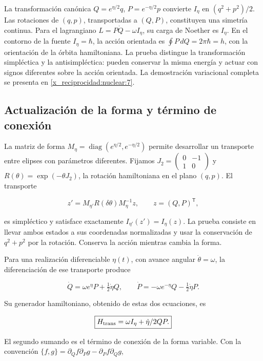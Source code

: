 La transformación canónica \(Q=e^{\eta/2}q\), \(P=e^{-\eta/2}p\) convierte \(I_\eta\) en \((q^2+p^2)/2\). Las rotaciones de \((q,p)\), transportadas a \((Q,P)\), constituyen una simetría continua. Para el lagrangiano \(L=P\dot Q-\omega I_\eta\), su carga de Noether es \(I_\eta\). En el contorno de la fuente \(I_\eta=\hbar\), la acción orientada es \(\oint P\,dQ=2\pi\hbar=h\), con la orientación de la órbita hamiltoniana. La prueba distingue la transformación simpléctica y la antisimpléctica: pueden conservar la misma energía y actuar con signos diferentes sobre la acción orientada. La demostración variacional completa se presenta en \cref{x_reciprocidad:nuclear:7}.

\subsection{Actualización de la forma y término de conexión}

La matriz de forma \(M_\eta=\operatorname{diag}(e^{\eta/2},e^{-\eta/2})\) permite desarrollar un transporte entre elipses con parámetros diferentes. Fijamos \(J_2=\begin{pmatrix}0&-1\\1&0\end{pmatrix}\) y \(R(\theta)=\exp(-\theta J_2)\), la rotación hamiltoniana en el plano \((q,p)\). El transporte

\[
z'=M_{\eta'}R(\delta\theta)M_\eta^{-1}z,
\qquad z=(Q,P)^\mathsf T,
\]

es simpléctico y satisface exactamente \(I_{\eta'}(z')=I_\eta(z)\). La prueba consiste en llevar ambos estados a sus coordenadas normalizadas y usar la conservación de \(q^2+p^2\) por la rotación. Conserva la acción mientras cambia la forma.

Para una realización diferenciable \(\eta(t)\), con avance angular \(\dot\theta=\omega\), la diferenciación de ese transporte produce

\[
\dot Q=\omega e^\eta P+\tfrac12\dot\eta Q,\qquad
\dot P=-\omega e^{-\eta}Q-\tfrac12\dot\eta P.
\]

Su generador hamiltoniano, obtenido de estas dos ecuaciones, es

\begin{equation}
\boxed{H_{\rm trans}=\omega I_\eta+\frac{\dot\eta}{2}QP.}\label{x_reciprocidad:nuc02:eq:7}
\end{equation}

El segundo sumando es el término de conexión de la forma variable. Con la convención \(\{f,g\}=\partial_Qf\partial_Pg-\partial_Pf\partial_Qg\),

